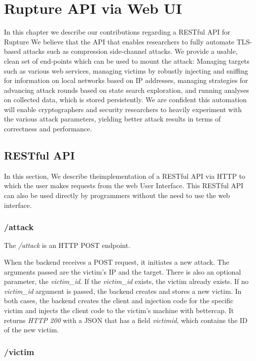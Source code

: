 \chapter{Rupture API via Web UI}\label{rupture_api}

In this chapter we describe our contributions regarding a RESTful API for Rupture
We believe that the API that enables researchers to fully automate 
TLS-based attacks such as compression side-channel attacks. We
provide a usable, clean set of end-points which can be used to mount the
attack: Managing targets such as various web services, managing victims by
robustly injecting and sniffing for information on local networks based on IP
addresses, managing strategies for advancing attack rounds based on state
search exploration, and running analyses on collected data, which is stored
persistently. We are confident this automation will enable cryptographers and
security researchers to heavily experiment with the various attack parameters,
yielding better attack results in terms of correctness and performance.

\section{RESTful API}
In this section, We describe theimplementation of  a RESTful API via HTTP 
to which the user makes requests from the web User Interface. This 
RESTful API can also be used directly by programmers without the need 
to use the web interface.

\subsection{/attack}

The \textit{/attack} is an HTTP POST endpoint. 

When the backend receives a POST request, it initiates a new attack.
The arguments passed are the victim's IP and the target. There is also an optional
parameter, the \textit{victim\_id}. If the \textit{victim\_id} exists,
the victim already exists. If no \textit{victim\_id} argument is passed, the backend 
creates and stores a new victim. In both cases, the backend
creates the client and injection code for the specific victim and 
injects the client code to the victim's machine with bettercap. 
It returns \textit{HTTP 200} with a JSON that has a 
field \textit{victimid}, which contains the ID of the new victim.

\subsection{/victim}

